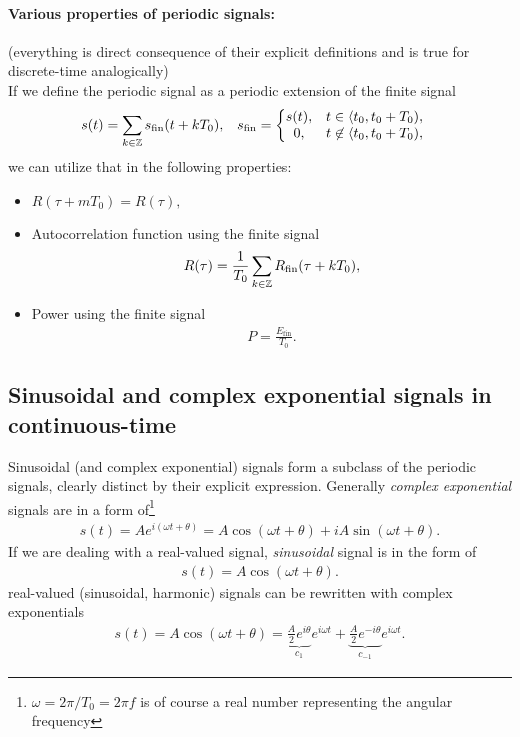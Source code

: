 \documentclass[11pt,a4paper]{report}
\theoremstyle{remark}
\theoremstyle{definition}
\begin{document}
				\paragraph{Various properties of periodic signals:} (everything is direct consequence of their explicit definitions and is true for discrete-time analogically) \\
					If we define the periodic signal as a periodic extension of the finite signal
					\begin{align}
						s(t) &= \sum_{k \in {\mathbb Z}} s_{\mathrm{fin}}(t + k T_0),
					&
						s_{\mathrm{fin}} &=
							\left\{ \begin{matrix}
								s(t), & t \in \langle t_0,t_0 + T_0), \\
								0, & t \not\in \langle t_0,t_0 + T_0),
							\end{matrix} \right.
					\end{align}
					we can utilize that in the following properties:
					\begin{itemize}
						\item $R(\tau + m T_0) = R(\tau),$
						\item Autocorrelation function using the finite signal
							\begin{align}
								R(\tau) = \frac{1}{T_0} \sum_{k \in {\mathbb Z}} R_{\mathrm{fin}}(\tau + k T_0),
							\end{align}
						\item Power using the finite signal
							\begin{align}
								P = \frac{E_{\mathrm{fin}}}{T_0}.
							\end{align}
					\end{itemize}
				
			\subsection{Sinusoidal and complex exponential signals in continuous-time}
				
				Sinusoidal (and complex exponential) signals form a subclass of the periodic signals, clearly distinct by their explicit expression. Generally \textit{complex exponential} signals are in a form of\footnote{$\omega = 2 \pi / T_0 = 2 \pi f$ is of course a real number representing the angular frequency}
				\begin{align}
					\label{def:ctcomplexp}
					s(t) = A e^{i (\omega t + \theta)} = A \cos(\omega t + \theta) + i A \sin(\omega t + \theta).
				\end{align}
				If we are dealing with a real-valued signal, \textit{sinusoidal} signal is in the form of
				\begin{align}
					\label{def:ctsin}
					s(t) = A \cos(\omega t + \theta).
				\end{align}
				real-valued (sinusoidal, harmonic) signals can be rewritten with complex exponentials
				\begin{align}
					s(t) = A \cos(\omega t + \theta) = \underbrace{\frac A2 e^{i  \theta}}_{c_1} e^{i \omega t} + \underbrace{\frac A2 e^{-i \theta}}_{c_{-1}} e^{i \omega t}.
				\end{align}
				
\end{document}
